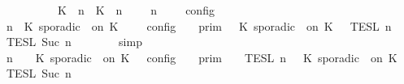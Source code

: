 \begin{isabellebody}
\ \ \ \ \ \ \ \ \ \ {\isasymunion}\ {\isasymlbrakk}\ {\isacharparenleft}{\isacharparenleft}K\ {\isasymUp}\ n{\isacharparenright}\ {\isacharhash}\ {\isacharparenleft}K\ {\isasymDown}\ n\ {\isacharat}\ {\isasymtau}{\isacharparenright}\ {\isacharhash}\ {\isasymGamma}{\isacharparenright}{\isacharcomma}\ n\ {\isasymturnstile}\ {\isasymPsi}\ {\isasymtriangleright}\ {\isasymPhi}\ {\isasymrbrakk}\isactrlsub c\isactrlsub o\isactrlsub n\isactrlsub f\isactrlsub i\isactrlsub g{\isacartoucheclose}\isanewline
%
\isadelimproof
\ \ %
\endisadelimproof
%
\isatagproof
{}\isamarkupfalse%
\ {\isacharminus}\isanewline
\ \ \ \ \isamarkupfalse%
\ {\isacartoucheopen}{\isasymlbrakk}\ {\isasymGamma}{\isacharcomma}\ n\ {\isasymturnstile}\ {\isacharparenleft}K\ sporadic\ {\isasymtau}\ on\ K\ {\isacharhash}\ {\isasymPsi}\ {\isasymtriangleright}\ {\isasymPhi}\ {\isasymrbrakk}\isactrlsub c\isactrlsub o\isactrlsub n\isactrlsub f\isactrlsub i\isactrlsub g\ {\isacharequal}\ {\isasymlbrakk}{\isasymlbrakk}\ {\isasymGamma}\ {\isasymrbrakk}{\isasymrbrakk}\isactrlsub p\isactrlsub r\isactrlsub i\isactrlsub m\ {\isasyminter}\ {\isasymlbrakk}{\isasymlbrakk}\ {\isacharparenleft}K\ sporadic\ {\isasymtau}\ on\ K\ {\isacharhash}\ {\isasymPsi}\ {\isasymrbrakk}{\isasymrbrakk}\isactrlsub T\isactrlsub E\isactrlsub S\isactrlsub L\isactrlbsup {\isasymge}\ n\isactrlesup \ {\isasyminter}\ {\isasymlbrakk}{\isasymlbrakk}\ {\isasymPhi}\ {\isasymrbrakk}{\isasymrbrakk}\isactrlsub T\isactrlsub E\isactrlsub S\isactrlsub L\isactrlbsup {\isasymge}\ Suc\ n\isactrlesup {\isacartoucheclose}\isanewline
\ \ \ \ \ \ \isamarkupfalse%
\ simp\isanewline
\ \ \ \ \isamarkupfalse%
\ \isamarkupfalse%
\ {\isacartoucheopen}{\isasymlbrakk}\ {\isasymGamma}{\isacharcomma}\ n\ {\isasymturnstile}\ {\isasymPsi}\ {\isasymtriangleright}\ {\isacharparenleft}{\isacharparenleft}K\ sporadic\ {\isasymtau}\ on\ K\ {\isacharhash}\ {\isasymPhi}{\isacharparenright}\ {\isasymrbrakk}\isactrlsub c\isactrlsub o\isactrlsub n\isactrlsub f\isactrlsub i\isactrlsub g\ {\isacharequal}\ {\isasymlbrakk}{\isasymlbrakk}\ {\isasymGamma}\ {\isasymrbrakk}{\isasymrbrakk}\isactrlsub p\isactrlsub r\isactrlsub i\isactrlsub m\ {\isasyminter}\ {\isasymlbrakk}{\isasymlbrakk}\ {\isasymPsi}\ {\isasymrbrakk}{\isasymrbrakk}\isactrlsub T\isactrlsub E\isactrlsub S\isactrlsub L\isactrlbsup {\isasymge}\ n\isactrlesup \ {\isasyminter}\ {\isasymlbrakk}{\isasymlbrakk}\ {\isacharparenleft}K\ sporadic\ {\isasymtau}\ on\ K\ {\isacharhash}\ {\isasymPhi}\ {\isasymrbrakk}{\isasymrbrakk}\isactrlsub T\isactrlsub E\isactrlsub S\isactrlsub L\isactrlbsup {\isasymge}\ Suc\ n\isactrlesup {\isacartoucheclose}\isanewline

\end{isabellebody}

